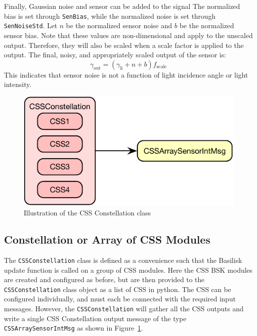 
Finally, Gaussian noise and sensor can be added to the signal The normalized bias is set through {\tt SenBias}, while the normalized noise is set through {\tt SenNoiseStd}.   Let $ n$ be the normalized sensor noise and $b$ be the normalized sensor bias.  Note that these values are non-dimensional and apply to the unscaled output.  Therefore, they will also be scaled when a scale factor is applied to the output. The final, noisy, and appropriately scaled output of the sensor is:
\begin{equation}
	\gamma_{\mathrm{out}} = (\gamma_{\textrm{li}} + n + b) f_{\mathrm{scale}} 
\end{equation}
This indicates that sensor noise is not a function of light incidence angle or light intensity.



\begin{figure}[htb]
	\centerline{
	\includegraphics[]{Figures/moduleDiagramConstellation}
	}
	\caption{Illustration of the CSS Constellation class}
	\label{fig:moduleDiagramConstellation}
\end{figure}
\subsection{Constellation or Array of CSS Modules}
The {\tt CSSConstellation} class is defined as a convenience such that the Basilisk update function is called on a group of CSS modules.  Here the CSS BSK modules are created and configured as before, but are then provided to the {\tt CSSConstellation} class object as a list of CSS in python.  The CSS can be configured individually, and must each be connected with the required input messages.  However, the {\tt CSSConstellation} will gather all the CSS outputs and write a single CSS Constellation output message of the type {\tt CSSArraySensorIntMsg} as shown in Figure~\ref{fig:moduleDiagramConstellation}.  



